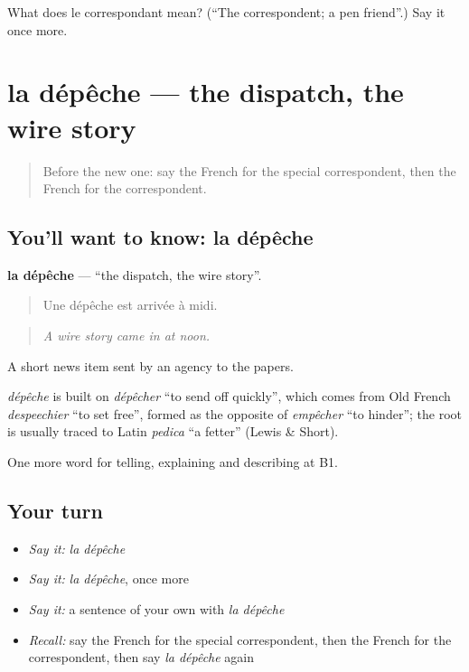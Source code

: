 \begin{tcolorbox}[breakable,colback=teal!4,colframe=teal!35!black,title={Before you move on}]
What does le correspondant mean? (\textquotedblleft{}The correspondent; a pen friend\textquotedblright{}.) Say it once more.
\end{tcolorbox}
\section[la dépêche]{la dépêche — the dispatch, the wire story}

\label{lesson:FR-C281-depeche}



\begin{quote}
Before the new one: say the French for the special correspondent, then the French for the correspondent.
\end{quote}

\subsection*{You'll want to know: la dépêche}
\textbf{la dépêche} — \textquotedblleft{}the dispatch, the wire story\textquotedblright{}.

\begin{quote}
Une dépêche est arrivée à midi.
\end{quote}

\begin{quote}
\emph{A wire story came in at noon.}
\end{quote}

A short news item sent by an agency to the papers.

\begin{cousinweb}
\emph{dépêche} is built on \emph{dépêcher} \textquotedblleft{}to send off quickly\textquotedblright{}, which comes from Old French \emph{despeechier} \textquotedblleft{}to set free\textquotedblright{}, formed as the opposite of \emph{empêcher} \textquotedblleft{}to hinder\textquotedblright{}; the root is usually traced to Latin \emph{pedica} \textquotedblleft{}a fetter\textquotedblright{} (Lewis \& Short).
\end{cousinweb}

\begin{grammarlens}[title={What you've built}]
One more word for telling, explaining and describing at B1.
\end{grammarlens}

\subsection*{Your turn}
\begin{itemize}
\raggedright
  \item \emph{Say it:} \emph{la dépêche}
  \item \emph{Say it:} \emph{la dépêche}, once more
  \item \emph{Say it:} a sentence of your own with \emph{la dépêche}
  \item \emph{Recall:} say the French for the special correspondent, then the French for the correspondent, then say \emph{la dépêche} again
\end{itemize}

